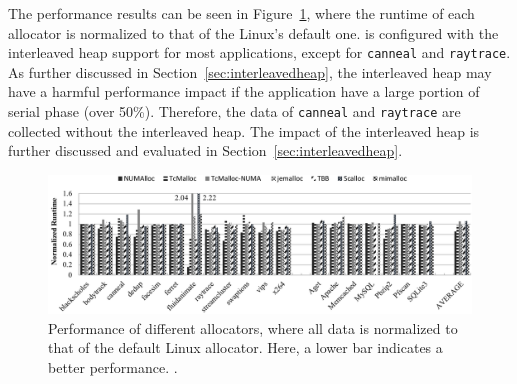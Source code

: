  The performance results can be seen in Figure~\ref{fig:perf}, where the runtime of each allocator is normalized to that of the Linux's default one. \NM{} is configured with the interleaved heap support for most applications, except for \texttt{canneal} and \texttt{raytrace}. As further discussed in Section~\ref{sec:interleavedheap}, the interleaved heap may have a harmful performance impact if the application have a large portion of serial phase (over 50\%). Therefore, the data of \texttt{canneal} and \texttt{raytrace} are collected without the interleaved heap. The impact of the interleaved heap is further discussed and evaluated in Section~\ref{sec:interleavedheap}. 


\begin{figure}[!ht]
    \centering
   
    \includegraphics[width=6.2in]{figure/8-node-parsec-perf.pdf}
    \caption{Performance of different allocators, where all data is normalized to that of the default Linux allocator. Here, a lower bar indicates a better performance. . 
    \label{fig:perf}}
 \end{figure}


